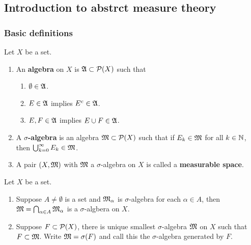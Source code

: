 \documentclass[a4paper]{article}
\renewcommand{\cupinfk}{\bigcup_{k=0}^\infty}
\begin{document}
\subsection{Introduction to abstrct measure theory}

\subsubsection{Basic definitions}

\begin{defi}
  Let $X$ be a set.
  \begin{enumerate}
    \item An \textbf{algebra} on $X$ is $\afk \subset \P(X)$ such that
          \begin{enumerate}
            \item $\emptyset \in \afk$.
            \item $E \in \afk$ implies $E^c \in \afk$.
            \item $E, F \in \afk$ implies $E \cup F \in \afk$.
          \end{enumerate}

    \item A \textbf{$\sigma$-algebra} is an algebra $\mf \subset \P(X)$
          such that if $E_k \in \mf$ for all $k \in \N$, then $\cupinfk
          E_k \in \mf$.

    \item A pair $(X, \mf)$ with $\mf$ a $\sigma$-algebra on $X$ is called
          a \textbf{measurable space}.
  \end{enumerate}
\end{defi}

\begin{thm}
  Let $X$ be a set.
  \begin{enumerate}
    \item Suppose $A \neq \emptyset$ is a set and $\mf_\alpha$ is
          $\sigma$-algebra for each $ \alpha \in A$, then $\mf =
          \bigcap_{\alpha \in A} \mf_\alpha$ is a $\sigma$-algbera on $X$.

    \item Suppose $F \subset \P(X)$, there is unique smallest
          $\sigma$-algebra $\mf$ on $X$ such that $F \subset \mf$. Write
          $\mf = \sigma(F)$ and call this the $\sigma$-algebra generated
          by $F$.
  \end{enumerate}
\end{thm}
\end{document}
